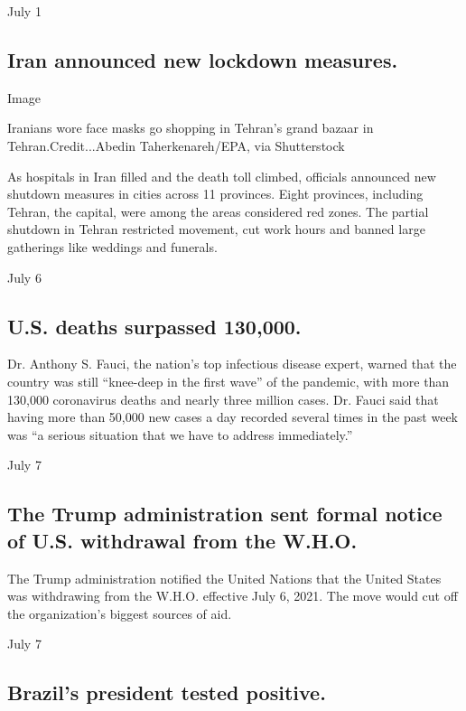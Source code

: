 July 1

\hypertarget{iran-announced-new-lockdown-measures}{%
\subsection{Iran announced new lockdown
measures.}\label{iran-announced-new-lockdown-measures}}

Image

Iranians wore face masks go shopping in Tehran's grand bazaar in
Tehran.Credit...Abedin Taherkenareh/EPA, via Shutterstock

As hospitals in Iran filled and the death toll climbed, officials
announced new shutdown measures in cities across 11 provinces. Eight
provinces, including Tehran, the capital, were among the areas
considered red zones. The partial shutdown in Tehran restricted
movement, cut work hours and banned large gatherings like weddings and
funerals.

July 6

\hypertarget{us-deaths-surpassed-130000}{%
\subsection{U.S. deaths surpassed
130,000.}\label{us-deaths-surpassed-130000}}

Dr. Anthony S. Fauci, the nation's top infectious disease expert, warned
that the country was still ``knee-deep in the first wave'' of the
pandemic, with more than 130,000 coronavirus deaths and nearly three
million cases. Dr. Fauci said that having more than 50,000 new cases a
day recorded several times in the past week was ``a serious situation
that we have to address immediately.''

July 7

\hypertarget{the-trump-administration-sent-formal-notice-of-us-withdrawal-from-the-who}{%
\subsection{The Trump administration sent formal notice of U.S.
withdrawal from the
W.H.O.}\label{the-trump-administration-sent-formal-notice-of-us-withdrawal-from-the-who}}

The Trump administration notified the United Nations that the United
States was withdrawing from the W.H.O. effective July 6, 2021. The move
would cut off the organization's biggest sources of aid.

July 7

\hypertarget{brazils-president-tested-positive}{%
\subsection{Brazil's president tested
positive.}\label{brazils-president-tested-positive}}

